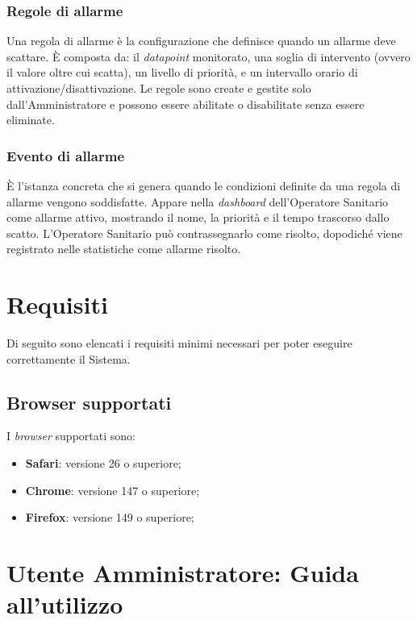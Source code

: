 \documentclass[10pt, letterpaper]{article}
\begin{document}
\subsubsection{Regole di allarme}
Una regola di allarme è la configurazione che definisce quando un 
allarme deve scattare. 
È composta da: il \textit{datapoint} monitorato, una soglia di intervento 
(ovvero il valore oltre cui scatta), un livello di priorità, 
e un intervallo orario di attivazione/disattivazione. 
Le regole sono create e gestite solo dall'Amministratore e possono essere 
abilitate o disabilitate senza essere eliminate.
\subsubsection{Evento di allarme}
È l'istanza concreta che si genera quando le condizioni definite da 
una regola di allarme vengono soddisfatte. 
Appare nella \textit{dashboard} dell'Operatore Sanitario come allarme attivo, 
mostrando il nome, la priorità e il tempo trascorso dallo scatto. 
L'Operatore Sanitario può contrassegnarlo come risolto, 
dopodiché viene registrato nelle statistiche come allarme risolto.

\section{Requisiti}
\label{sec:requisiti}

Di seguito sono elencati i requisiti minimi necessari per poter eseguire correttamente il Sistema.

\subsection{Browser supportati}
\label{sec:browsers}

I \textit{browser} supportati sono:

\begin{itemize}
    \item   \textbf{Safari}: versione 26 o superiore;
    \item   \textbf{Chrome}: versione 147 o superiore;
    \item   \textbf{Firefox}: versione 149 o superiore;
\end{itemize}

\section{Utente Amministratore: Guida all'utilizzo}
\end{document}
